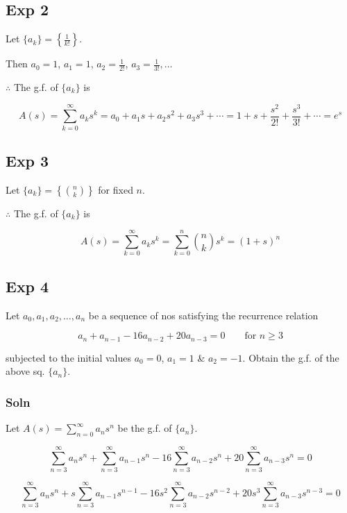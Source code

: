 \documentclass[
]{article}
\begin{document}
\subsection{Exp 2}\label{exp-2}

Let \(\{a_k\} = \left\{ \frac{1}{k!} \right\}\).

Then \(a_0 = 1\), \(a_1 = 1\), \(a_2 = \frac{1}{2!}\),
\(a_3 = \frac{1}{3!}, \ldots\)

\(\therefore\) The g.f. of \(\{a_k\}\) is

\[A(s) = \sum_{k=0}^{\infty} a_k s^k = a_0 + a_1 s + a_2 s^2 + a_3 s^3 + \cdots = 1 + s + \frac{s^2}{2!} + \frac{s^3}{3!} + \cdots = e^s\]

\subsection{Exp 3}\label{exp-3}

Let \(\{a_k\} = \left\{ \binom{n}{k} \right\}\) for fixed \(n\).

\(\therefore\) The g.f. of \(\{a_k\}\) is

\[A(s) = \sum_{k=0}^{\infty} a_k s^k = \sum_{k=0}^{n} \binom{n}{k} s^k = (1+s)^n\]

\subsection{Exp 4}\label{exp-4}

Let \(a_0, a_1, a_2, \ldots, a_n\) be a sequence of nos satisfying the
recurrence relation

\[a_n + a_{n-1} - 16 a_{n-2} + 20 a_{n-3} = 0 \qquad \text{for } n \ge 3\]

subjected to the initial values \(a_0 = 0\), \(a_1 = 1\) \&
\(a_2 = -1\). Obtain the g.f. of the above sq. \(\{a_n\}\).

\subsubsection{Soln}\label{soln}

Let \(A(s) = \sum_{n=0}^{\infty} a_n s^n\) be the g.f. of \(\{a_n\}\).

\[\sum_{n=3}^{\infty} a_n s^n + \sum_{n=3}^{\infty} a_{n-1} s^n - 16 \sum_{n=3}^{\infty} a_{n-2} s^n + 20 \sum_{n=3}^{\infty} a_{n-3} s^n = 0\]

\[\sum_{n=3}^{\infty} a_n s^n + s \sum_{n=3}^{\infty} a_{n-1} s^{n-1} - 16 s^2 \sum_{n=3}^{\infty} a_{n-2} s^{n-2} + 20 s^3 \sum_{n=3}^{\infty} a_{n-3} s^{n-3} = 0\]
\end{document}
